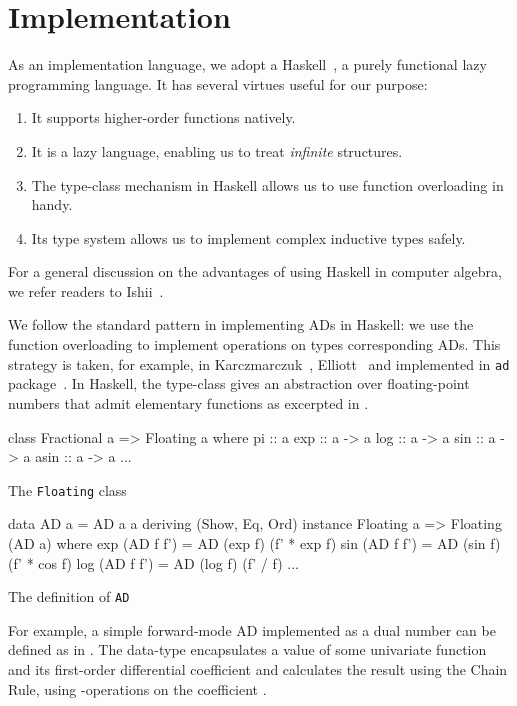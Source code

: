 \documentclass[./rims-smooth-paper.tex]{subfiles}
\begin{document}
\section{Implementation}
\label{sec:impl}
As an implementation language, we adopt a Haskell~\cite{haskell.org:2021tt}, a purely functional lazy programming language.
It has several virtues useful for our purpose:
\begin{enumerate}
\item It supports higher-order functions natively.
\item It is a lazy language, enabling us to treat \emph{infinite} structures.
\item The type-class mechanism in Haskell allows us to use function overloading in handy.
\item Its type system allows us to implement complex inductive types safely.
\end{enumerate}
For a general discussion on the advantages of using Haskell in computer algebra, we refer readers to Ishii~\cite{ISHII:2018ek}.

We follow the standard pattern in implementing ADs in Haskell: we use the function overloading to implement operations on types corresponding ADs.
This strategy is taken, for example, in Karczmarczuk~\cite{Karczmarczuk:2001ww}, Elliott~\cite{Elliott2009-beautiful-differentiation} and implemented in \texttt{ad} package~\cite{Kmett:2010aa}.
In Haskell, the  type-class gives an abstraction over floating-point numbers that admit elementary functions as excerpted in .
\begin{listing}[tbp]
\begin{code}
class Fractional a => Floating a where
  pi :: a
  exp :: a -> a
  log :: a -> a
  sin :: a -> a
  asin :: a -> a
  ...
\end{code}
\caption{The \texttt{Floating} class\label{lst:cls-floating}}
\end{listing}
\begin{listing}[tbp]
\begin{code}
  data AD a = AD a a deriving (Show, Eq, Ord)
  instance Floating a => Floating (AD a) where
    exp (AD f f') = AD (exp f) (f' * exp f)
    sin (AD f f') = AD (sin f) (f' * cos f)
    log (AD f f') = AD (log f) (f' / f)
    ...
\end{code}
\caption{The definition of \texttt{AD}\label{lst:def-AD}}
\end{listing}

For example, a simple forward-mode AD implemented as a dual number can be defined as in .
The data-type  encapsulates a value of some univariate function and its first-order differential coefficient and calculates the result using the Chain Rule, using -operations on the coefficient .
\end{document}

